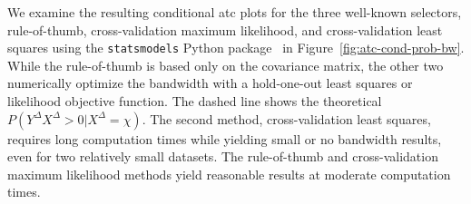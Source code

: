 \documentclass[pdflatex]{sn-jnl}
\theoremstyle{plain}%
\theoremstyle{definition}
\newcommand{\diffxrv}{X^{\Delta}}
\newcommand{\diffyrv}{Y^{\Delta}}
\newcommand{\xcond}{\chi}
\begin{document}
We examine the resulting conditional \ac{atc} plots for the three well-known selectors, rule-of-thumb, cross-validation maximum likelihood, and cross-validation least squares using the \verb|statsmodels| Python package~\citep{Seabold2010} in Figure~\ref{fig:atc-cond-prob-bw}.
While the rule-of-thumb is based only on the covariance matrix, the other two numerically optimize the bandwidth with a hold-one-out least squares or likelihood objective function.
The dashed line shows the theoretical $P(\diffyrv \diffxrv > 0 | \diffxrv = \xcond)$.
The second method, cross-validation least squares, requires long computation times while yielding small or no bandwidth results, even for two relatively small datasets.
The rule-of-thumb and cross-validation maximum likelihood methods yield reasonable results at moderate computation times.
\end{document}
